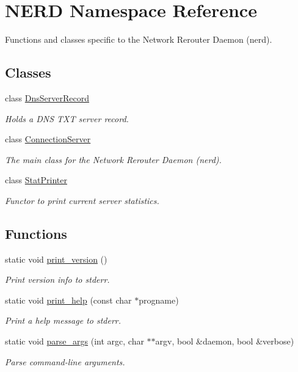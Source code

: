 \hypertarget{namespaceNERD}{
\section{\-N\-E\-R\-D \-Namespace \-Reference}
\label{namespaceNERD}
}


\-Functions and classes specific to the \-Network \-Rerouter \-Daemon (nerd).  


\subsection*{\-Classes}
\begin{DoxyCompactItemize}
\item 
class \hyperlink{classNERD_1_1DnsServerRecord}{\-Dns\-Server\-Record}
\begin{DoxyCompactList}\small\item\em \-Holds a \-D\-N\-S \-T\-X\-T server record. \end{DoxyCompactList}\item 
class \hyperlink{classNERD_1_1ConnectionServer}{\-Connection\-Server}
\begin{DoxyCompactList}\small\item\em \-The main class for the \-Network \-Rerouter \-Daemon (nerd). \end{DoxyCompactList}\item 
class \hyperlink{classNERD_1_1StatPrinter}{\-Stat\-Printer}
\begin{DoxyCompactList}\small\item\em \-Functor to print current server statistics. \end{DoxyCompactList}\end{DoxyCompactItemize}
\subsection*{\-Functions}
\begin{DoxyCompactItemize}
\item 
static void \hyperlink{namespaceNERD_a71e1a6782f9ca0dad5c6215030cb69dd}{print\-\_\-version} ()
\begin{DoxyCompactList}\small\item\em \-Print version info to stderr. \end{DoxyCompactList}\item 
static void \hyperlink{namespaceNERD_a55373ab13cf2b623be6d20f03be57f93}{print\-\_\-help} (const char $\ast$progname)
\begin{DoxyCompactList}\small\item\em \-Print a help message to stderr. \end{DoxyCompactList}\item 
static void \hyperlink{namespaceNERD_aa16f179fc762db5db0912611f1a82d57}{parse\-\_\-args} (int argc, char $\ast$$\ast$argv, bool \&daemon, bool \&verbose)
\begin{DoxyCompactList}\small\item\em \-Parse command-\/line arguments. \end{DoxyCompactList}\end{DoxyCompactItemize}


